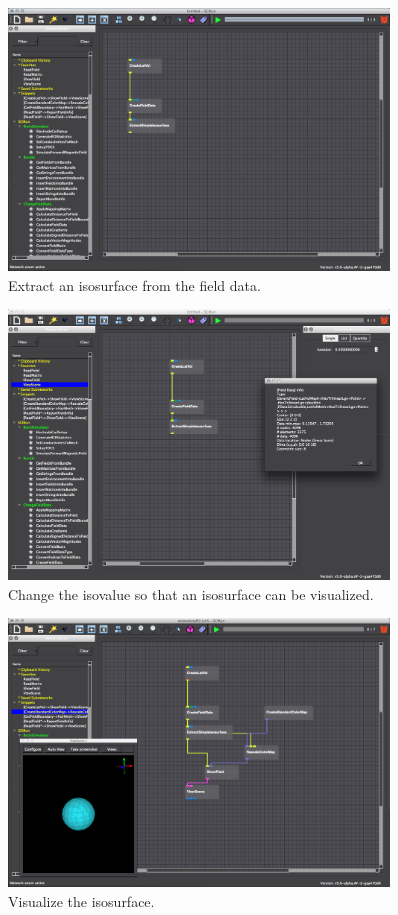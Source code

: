 \documentclass[fleqn,11pt,openany]{book}
\begin{document}
\begin{figure}[H]
\center
\includegraphics[width=0.9\textwidth]{BasicTutorial_figures/extractiso2.png}
\caption{Extract an isosurface from the field data.}
\label{fig:extractisosurf2}
\end{figure}

\begin{figure}[H]
\center
\includegraphics[width=0.9\textwidth]{BasicTutorial_figures/selectisoval.png}
\caption{Change the isovalue so that an isosurface can be visualized.}
\label{fig:conncolormap}
\end{figure}

\begin{figure}[H]
\center
\includegraphics[width=0.9\textwidth]{BasicTutorial_figures/viewisocirc.png}
\caption{Visualize the isosurface.}
\label{fig:viewdefaultisosurf}
\end{figure}
\end{document}
